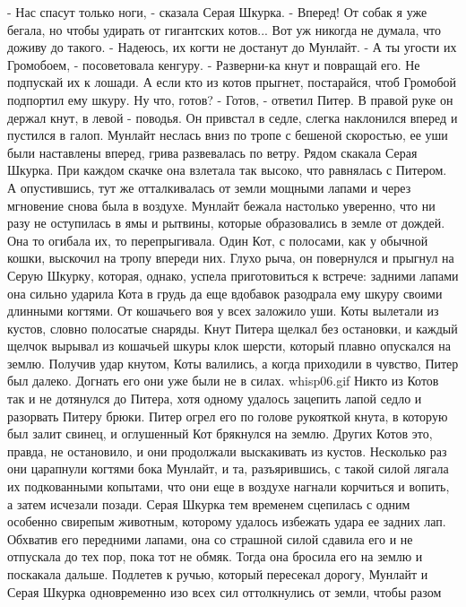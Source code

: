     - Нас спасут только ноги, - сказала Серая Шкурка. - Вперед! От 
собак я уже бегала, но чтобы удирать от гигантских котов... Вот уж 
никогда не думала, что доживу до такого.
    - Надеюсь, их когти не достанут до Мунлайт.
    - А ты угости их Громобоем, - посоветовала кенгуру. - Разверни-ка 
кнут и повращай его. Не подпускай их к лошади. А если кто из котов 
прыгнет, постарайся, чтоб Громобой подпортил ему шкуру. Ну что, готов?
    - Готов, - ответил Питер. В правой руке он держал кнут, в левой - 
поводья. Он привстал в седле, слегка наклонился вперед и пустился в 
галоп. Мунлайт неслась вниз по тропе с бешеной скоростью, ее уши были 
наставлены вперед, грива развевалась по ветру. Рядом скакала Серая 
Шкурка. При каждом скачке она взлетала так высоко, что равнялась с 
Питером. А опустившись, тут же отталкивалась от земли мощными лапами и 
через мгновение снова была в воздухе.
    Мунлайт бежала настолько уверенно, что ни разу не оступилась в ямы 
и рытвины, которые образовались в земле от дождей. Она то огибала их, 
то перепрыгивала.
    Один Кот, с полосами, как у обычной кошки, выскочил на тропу 
впереди них. Глухо рыча, он повернулся и прыгнул на Серую Шкурку, 
которая, однако, успела приготовиться к встрече: задними лапами она 
сильно ударила Кота в грудь да еще вдобавок разодрала ему шкуру своими 
длинными когтями.
    От кошачьего воя у всех заложило уши. Коты вылетали из кустов, 
словно полосатые снаряды. Кнут Питера щелкал без остановки, и каждый 
щелчок вырывал из кошачьей шкуры клок шерсти, который плавно опускался 
на землю. Получив удар кнутом, Коты валились, а когда приходили в 
чувство, Питер был далеко. Догнать его они уже были не в силах.
    {whisp06.gif}
    Никто из Котов так и не дотянулся до Питера, хотя одному удалось 
зацепить лапой седло и разорвать Питеру брюки. Питер огрел его по 
голове рукояткой кнута, в которую был залит свинец, и оглушенный Кот 
брякнулся на землю. Других Котов это, правда, не остановило, и они 
продолжали выскакивать из кустов. Несколько раз они царапнули когтями 
бока Мунлайт, и та, разъярившись, с такой силой лягала их подкованными 
копытами, что они еще в воздухе нагнали корчиться и вопить, а затем 
исчезали позади.
    Серая Шкурка тем временем сцепилась с одним особенно свирепым 
животным, которому удалось избежать удара ее задних лап. Обхватив его 
передними лапами, она со страшной силой сдавила его и не отпускала до 
тех пор, пока тот не обмяк. Тогда она бросила его на землю и поскакала 
дальше.
    Подлетев к ручью, который пересекал дорогу, Мунлайт и Серая Шкурка 
одновременно изо всех сил оттолкнулись от земли, чтобы разом 
